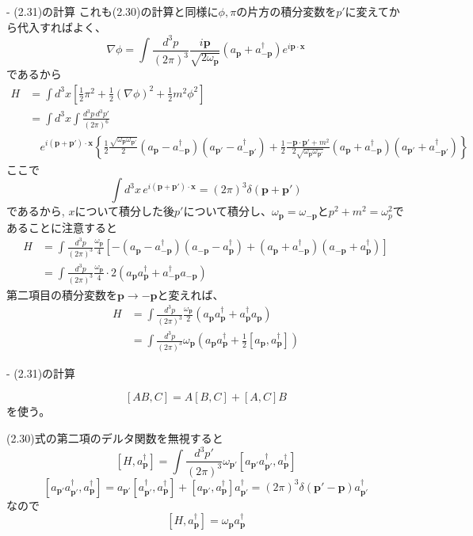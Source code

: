 - (2.31)の計算
これも(2.30)の計算と同様に$\phi, \pi$の片方の積分変数を$p'$に変えてから代入すればよく、
\[
  \nabla \phi = \int \frac{d^3 p}{(2\pi)^3} \frac{i\textbf{p}}{\sqrt{2\omega_{\textbf{p}}}} ( a_{\textbf{p}} + a_{-\textbf{p}}^\dagger ) e^{i \textbf{p} \cdot \textbf{x}}
\]
であるから
\begin{align*}
  H & = \int d^3x \left[ \frac{1}{2}\pi^2 + \frac{1}{2}(\nabla \phi)^2 + \frac{1}{2}m^2 \phi^2 \right] \\
    & = \int d^3x \int \frac{d^3 p \, d^3 p'}{(2\pi)^6} \\
    & \quad e^{i(\textbf{p}+\textbf{p}') \cdot \textbf{x}} \left\{
    \frac{1}{2} \frac{\sqrt{\omega_{\textbf{p}} \omega_{\textbf{p}'}}}{2} (a_{\textbf{p}} - a^\dagger_{-\textbf{p}})(a_{\textbf{p}'} - a^\dagger_{-\textbf{p}'}) + \frac{1}{2} \frac{-\textbf{p} \cdot \textbf{p}' + m^2}{2\sqrt{\omega_{\textbf{p}} \omega_{\textbf{p}'}}} (a_{\textbf{p}} + a^\dagger_{-\textbf{p}})(a_{\textbf{p}'} + a^\dagger_{-\textbf{p}'})
  \right\}
\end{align*}
ここで
\[
  \int d^3x \, e^{i(\textbf{p}+\textbf{p}') \cdot \textbf{x}} = (2\pi)^3 \delta(\textbf{p}+\textbf{p}')
\]
であるから, $x$について積分した後$p'$について積分し、$\omega_{\textbf{p}} = \omega_{-\textbf{p}}$と$p^2 + m^2 = \omega_p^2$であることに注意すると
\begin{align*}
  H
   & = \int \frac{d^3 p}{(2\pi)^3} \frac{\omega_{\textbf{p}}}{4} [-(a_{\textbf{p}} - a_{-\textbf{p}}^\dagger)(a_{-\textbf{p}} - a_{\textbf{p}}^\dagger) + (a_{\textbf{p}} + a_{-\textbf{p}}^\dagger)(a_{-\textbf{p}} + a_{\textbf{p}}^\dagger)] \\
   & = \int \frac{d^3 p}{(2\pi)^3} \frac{\omega_{\textbf{p}}}{4} \cdot 2(a_{\textbf{p}} a_{\textbf{p}}^\dagger + a_{-\textbf{p}}^\dagger a_{-\textbf{p}})
\end{align*}
第二項目の積分変数を$\textbf{p} \to -\textbf{p}$と変えれば、
\begin{align*}
  H & = \int \frac{d^3 p}{(2\pi)^3} \frac{\omega_{\textbf{p}}}{2} (a_{\textbf{p}} a_{\textbf{p}}^\dagger + a_{\textbf{p}}^\dagger a_{\textbf{p}}) \\
  & = \int \frac{d^3 p}{(2\pi)^3} \omega_{\textbf{p}} (a_{\textbf{p}} a_{\textbf{p}}^\dagger + \frac{1}{2}[a_{\textbf{p}}, a_{\textbf{p}}^\dagger])
\end{align*}

- (2.31)の計算

\[
  [AB, C] = A[B, C] + [A, C]B
\]
を使う。

(2.30)式の第二項のデルタ関数を無視すると
\[
  [H, a_{\textbf{p}}^\dagger] = \int \frac{d^3 p'}{(2\pi)^3} \omega_{\textbf{p}'} [a_{\textbf{p}'} a_{\textbf{p}'}^\dagger, a_{\textbf{p}}^\dagger]
\]
\[
  [a_{\textbf{p}'} a_{\textbf{p}'}^\dagger, a_{\textbf{p}}^\dagger] = a_{\textbf{p}'} [a_{\textbf{p}'}^\dagger, a_{\textbf{p}}^\dagger] + [a_{\textbf{p}'}, a_{\textbf{p}}^\dagger] a_{\textbf{p}'}^\dagger = (2\pi)^3 \delta(\textbf{p}' - \textbf{p}) a_{\textbf{p}'}^\dagger
\]
なので
\[
  [H, a_{\textbf{p}}^\dagger] = \omega_{\textbf{p}} a_{\textbf{p}}^\dagger
\]


